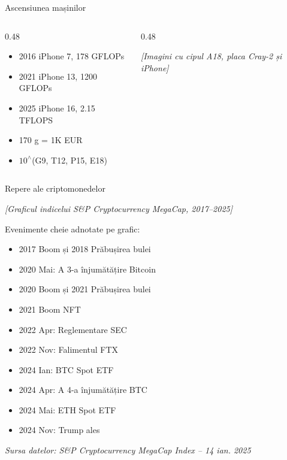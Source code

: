 \documentclass[9pt, aspectratio=169, t]{beamer}
\theoremstyle{definition}
\begin{document}
\begin{frame}{Ascensiunea mașinilor}
\begin{columns}[T]
\begin{column}{0.48\textwidth}
\begin{itemize}
    \item 2016 iPhone 7, 178 GFLOPs
    \item 2021 iPhone 13, 1200 GFLOPs
    \item 2025 iPhone 16, 2.15 TFLOPS
    \item 170 g = 1K EUR
    \item $10^{\wedge}$(G9, T12, P15, E18)
\end{itemize}
\end{column}
\begin{column}{0.48\textwidth}
\begin{center}
    {\small\textit{[Imagini cu cipul A18, placa Cray-2 și iPhone]}}
\end{center}
\end{column}
\end{columns}
\end{frame}

\begin{frame}{Repere ale criptomonedelor}
\begin{center}
    {\small\textit{[Graficul indicelui S\&P Cryptocurrency MegaCap, 2017--2025]}}

    \vspace{0.3cm}

    Evenimente cheie adnotate pe grafic:
\end{center}
\begin{itemize}
    \item 2017 Boom și 2018 Prăbușirea bulei
    \item 2020 Mai: A 3-a înjumătățire Bitcoin
    \item 2020 Boom și 2021 Prăbușirea bulei
    \item 2021 Boom NFT
    \item 2022 Apr: Reglementare SEC
    \item 2022 Nov: Falimentul FTX
    \item 2024 Ian: BTC Spot ETF
    \item 2024 Apr: A 4-a înjumătățire BTC
    \item 2024 Mai: ETH Spot ETF
    \item 2024 Nov: Trump ales
\end{itemize}
{\small\textit{Sursa datelor: S\&P Cryptocurrency MegaCap Index -- 14 ian. 2025}}
\end{frame}
\end{document}
